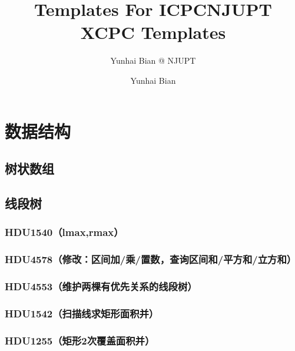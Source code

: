 \documentclass[12pt,a4paper]{article}
\title{Templates For ICPC}
\author{Yunhai Bian @ NJUPT}
\begin{document}
\title{NJUPT XCPC Templates}
\author {Yunhai Bian}
\maketitle
\tableofcontents
\newpage
\section{数据结构}
\subsection{树状数组}

\subsection{线段树}
\subsubsection{HDU1540（lmax,rmax）}
\begin{spacing}{1.5}

\end{spacing}

\subsubsection{HDU4578（修改：区间加/乘/置数，查询区间和/平方和/立方和）}
\begin{spacing}{1.5}

\end{spacing}

\subsubsection{HDU4553（维护两棵有优先关系的线段树）}
\begin{spacing}{1.5}

\end{spacing}

\subsubsection{HDU1542（扫描线求矩形面积并）}
\begin{spacing}{1.5}

\end{spacing}

\subsubsection{HDU1255（矩形2次覆盖面积并）}
\begin{spacing}{1.5}

\end{spacing}

\end{document}
